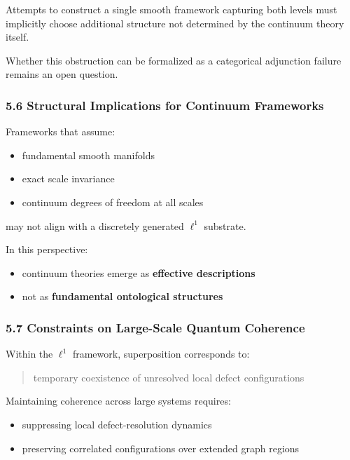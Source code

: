 \documentclass[
]{article}
\providecommand{\tightlist}{%
  \setlength{\itemsep}{0pt}\setlength{\parskip}{0pt}}
\begin{document}
Attempts to construct a single smooth framework capturing both levels
must implicitly choose additional structure not determined by the
continuum theory itself.

Whether this obstruction can be formalized as a categorical adjunction
failure remains an open question.

\subsubsection{5.6 Structural Implications for Continuum
Frameworks}\label{structural-implications-for-continuum-frameworks}

Frameworks that assume:

\begin{itemize}
\tightlist
\item
  fundamental smooth manifolds
\item
  exact scale invariance
\item
  continuum degrees of freedom at all scales
\end{itemize}

may not align with a discretely generated \(\ell^1\) substrate.

In this perspective:

\begin{itemize}
\tightlist
\item
  continuum theories emerge as \textbf{effective descriptions}
\item
  not as \textbf{fundamental ontological structures}
\end{itemize}

\subsubsection{5.7 Constraints on Large-Scale Quantum
Coherence}\label{constraints-on-large-scale-quantum-coherence}

Within the \(\ell^1\) framework, superposition corresponds to:

\begin{quote}
temporary coexistence of unresolved local defect configurations
\end{quote}

Maintaining coherence across large systems requires:

\begin{itemize}
\tightlist
\item
  suppressing local defect-resolution dynamics
\item
  preserving correlated configurations over extended graph regions
\end{itemize}
\end{document}
